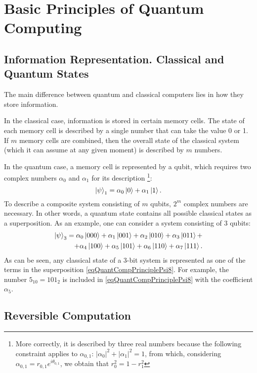 \section{Basic Principles of Quantum Computing}

\subsection{Information Representation. Classical and Quantum States}
The main difference between quantum and classical computers lies in how they store information.

In the classical case, information is stored in certain memory cells. The state of each memory cell is described by a single number that can take the value 0 or 1. If $m$ memory cells are combined, then the overall state of the classical system (which it can assume at any given moment) is described by $m$ numbers.

In the quantum case, a memory cell is represented by a qubit, which requires two complex numbers $\alpha_0$ and $\alpha_1$ for its description \footnote{More correctly, it is described by three real numbers because the following constraint applies to $\alpha_{0,1}$: $\left|\alpha_0\right|^2 + \left|\alpha_1\right|^2 = 1$, from which, considering $\alpha_{0,1} = r_{0,1}e^{i \theta_{0,1}}$, we obtain that $r_0^2 = 1 - r_1^2$}:
\[
\left|\psi\right>_1 = \alpha_0 \ket{ 0 } + \alpha_1 \ket{ 1 }.
\]
To describe a composite system consisting of $m$ qubits, $2^m$ complex numbers are necessary. In other words, a quantum state contains all possible classical states as a superposition. As an example, one can consider a system consisting of 3 qubits:
\begin{eqnarray}
\left|\psi\right>_3 = 
\alpha_0 \ket{ 000 } + 
\alpha_1 \ket{ 001 } + 
\alpha_2 \ket{ 010 } + 
\alpha_3 \ket{ 011 } + 
\nonumber \\
+ 
\alpha_4 \ket{ 100 } + 
\alpha_5 \ket{ 101 } + 
\alpha_6 \ket{ 110 } + 
\alpha_7 \ket{ 111 }.
\label{eqQuantCompPrinciplePsi8}
\end{eqnarray}
As can be seen, any classical state of a 3-bit system is represented as one of the terms in the superposition \eqref{eqQuantCompPrinciplePsi8}. For example, the number $5_{10}=101_2$ is included in \eqref{eqQuantCompPrinciplePsi8} with the coefficient $\alpha_5$.

\subsection{Reversible Computation}

